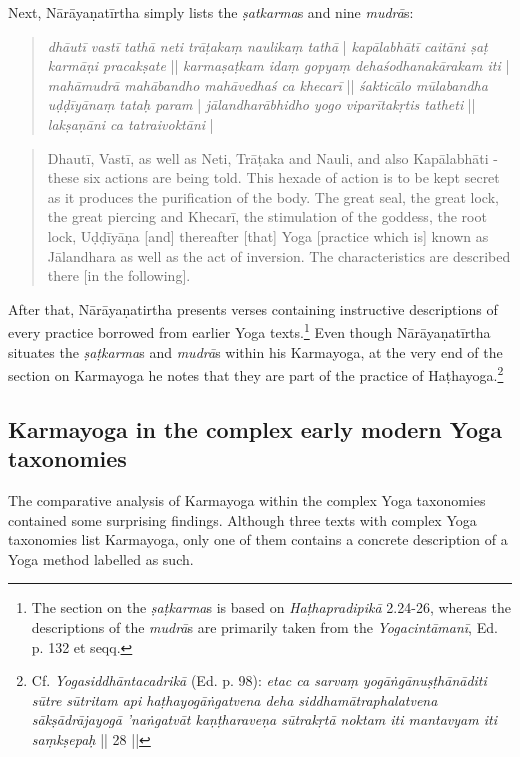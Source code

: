 Next, Nārāyaṇatīrtha simply lists the \textit{ṣatkarma}s and nine \textit{mudrā}s: 
\begin{quote}
\textit{dhāutī vastī tathā neti trāṭakaṃ naulikaṃ tathā} |
\textit{kapālabhātī caitāni ṣaṭ karmāṇi pracakṣate} ||
\textit{karmaṣaṭkam idaṃ gopyaṃ dehaśodhanakārakam iti} |
\textit{mahāmudrā mahābandho mahāvedhaś ca khecarī} ||
\textit{śakticālo mūlabandha uḍḍīyānaṃ tataḥ param} |
\textit{jālandharābhidho yogo viparītakṛtis tatheti} ||
\textit{lakṣaṇāni ca tatraivoktāni} |
\end{quote}
\begin{quote}
  Dhautī, Vastī, as well as Neti, Trāṭaka and Nauli,
  and also Kapālabhāti - these six actions are being told.
  This hexade of action is to be kept secret as it produces the purification of the body.
  The great seal, the great lock, the great piercing and Khecarī,
  the stimulation of the goddess, the root lock, Uḍḍīyāṇa [and] thereafter
  [that] Yoga [practice which is] known as Jālandhara as well as the act of inversion.
  The characteristics are described there [in the following]. 
  \end{quote}

After that, Nārāyaṇatirtha presents verses containing instructive descriptions of every practice borrowed from earlier Yoga texts.\footnote{The section on the \textit{ṣaṭkarma}s is based on \textit{Haṭhapradipikā} 2.24-26, whereas the descriptions of the \textit{mudrā}s are primarily taken from the \textit{Yogacintāmanī}, Ed. p. 132 et seqq.} Even though Nārāyaṇatīrtha situates the \textit{ṣaṭkarma}s and \textit{mudrā}s within his Karmayoga, at the very end of the section on Karmayoga he notes that they are part of the practice of Haṭhayoga.\footnote{Cf. \textit{Yogasiddhāntacadrikā} (Ed. p. 98): \textit{etac ca sarvaṃ yogāṅgānuṣṭhānāditi sūtre sūtritam api haṭhayogāṅgatvena deha siddhamātraphalatvena sākṣādrājayogā 'naṅgatvāt kaṇṭharaveṇa sūtrakṛtā noktam iti mantavyam iti saṃkṣepaḥ} || 28 ||}

\subsection{Karmayoga in the complex early modern Yoga taxonomies}

The comparative analysis of Karmayoga within the complex Yoga taxonomies contained some surprising findings. Although three texts with complex Yoga taxonomies list Karmayoga, only one of them contains a concrete description of a Yoga method labelled as such.


